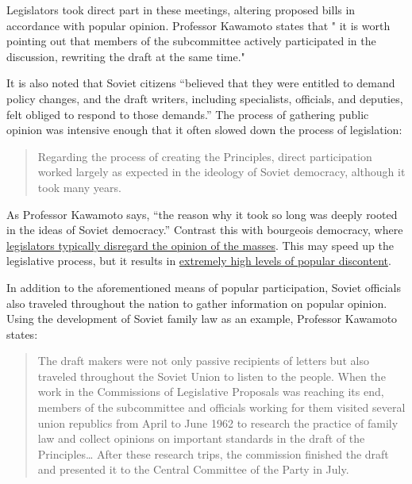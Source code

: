 Legislators took direct part in these meetings, altering proposed bills
in accordance with popular opinion. Professor Kawamoto states that " it
is worth pointing out that members of the subcommittee actively
participated in the discussion, rewriting the draft at the same time."

It is also noted that Soviet citizens ``believed that they were entitled
to demand policy changes, and the draft writers, including specialists,
officials, and deputies, felt obliged to respond to those demands.'' The
process of gathering public opinion was intensive enough that it often
slowed down the process of legislation:

\begin{quote}
Regarding the process of creating the Principles, direct participation
worked largely as expected in the ideology of Soviet democracy, although
it took many years.
\end{quote}

As Professor Kawamoto says, ``the reason why it took so long was deeply
rooted in the ideas of Soviet democracy.'' Contrast this with bourgeois
democracy, where
\href{https://scholar.princeton.edu/sites/default/files/mgilens/files/gilens_and_page_2014_-testing_theories_of_american_politics.doc.pdf}{legislators
typically disregard the opinion of the masses}. This may speed up the
legislative process, but it results in
\href{https://www.washingtonpost.com/news/rampage/wp/2015/09/23/americans-have-grown-to-really-really-hate-their-government/}{extremely
high levels of popular discontent}.

In addition to the aforementioned means of popular participation, Soviet
officials also traveled throughout the nation to gather information on
popular opinion. Using the development of Soviet family law as an
example, Professor Kawamoto states:

\begin{quote}
The draft makers were not only passive recipients of letters but also
traveled throughout the Soviet Union to listen to the people. When the
work in the Commissions of Legislative Proposals was reaching its end,
members of the subcommittee and officials working for them visited
several union republics from April to June 1962 to research the practice
of family law and collect opinions on important standards in the draft
of the Principles\ldots{} After these research trips, the commission
finished the draft and presented it to the Central Committee of the
Party in July.
\end{quote}

